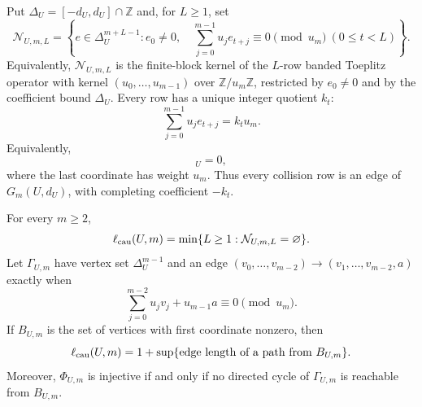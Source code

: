 Put $\Delta_U=[-d_U,d_U]\cap\mathbb Z$ and, for $L\ge1$, set
\begin{equation}
\mathcal N_{U,m,L}=\left\{e\in\Delta_U^{m+L-1}:
 e_0\ne0,\quad
 \sum_{j=0}^{m-1}u_je_{t+j}\equiv0\pmod {u_m}
 \ (0\le t<L)\right\}.
\label{eq:pisot-bad-sliding-set}
\end{equation}
Equivalently, $\mathcal N_{U,m,L}$ is the finite-block kernel of the
$L$-row banded Toeplitz operator with kernel
$(u_0,\ldots,u_{m-1})$ over $\mathbb Z/u_m\mathbb Z$, restricted by
$e_0\ne0$ and by the coefficient bound $\Delta_U$.  Every row has a unique
integer quotient $k_t$:
\begin{equation}
\sum_{j=0}^{m-1}u_je_{t+j}=k_tu_m.
\label{eq:pisot-window-carry}
\end{equation}
Equivalently,
\begin{equation}
[e_t,e_{t+1},\ldots,e_{t+m-1},-k_t]_U=0,
\label{eq:pisot-zero-word-bridge}
\end{equation}
where the last coordinate has weight $u_m$.  Thus every collision row is an
edge of $G_m(U,d_U)$, with completing coefficient $-k_t$.

\begin{lemma}
\label{lem:pisot-exact-collision-quotient}
For every $m\ge2$,
\begin{equation}
\ell_{\rm cau}(U,m)
=\min\{L\ge1:\mathcal N_{U,m,L}=\varnothing\}.
\label{eq:pisot-exact-depth}
\end{equation}
Let $\Gamma_{U,m}$ have vertex set $\Delta_U^{m-1}$ and an edge
$(v_0,\ldots,v_{m-2})\to(v_1,\ldots,v_{m-2},a)$ exactly when
\[
\sum_{j=0}^{m-2}u_jv_j+u_{m-1}a\equiv0\pmod {u_m}.
\]
If $B_{U,m}$ is the set of vertices with first coordinate nonzero, then
\begin{equation}
\ell_{\rm cau}(U,m)=1+\sup\{\text{edge length of a path from }B_{U,m}\}.
\label{eq:pisot-longest-path}
\end{equation}
Moreover, $\Phi_{U,m}$ is injective if and only if no directed cycle of
$\Gamma_{U,m}$ is reachable from $B_{U,m}$.
\end{lemma}

